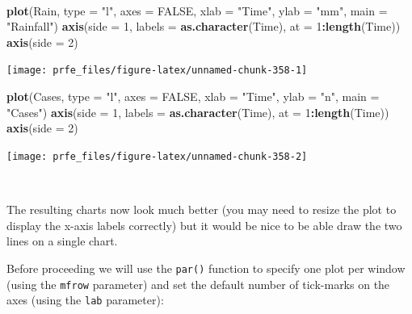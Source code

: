 \documentclass[12pt,a4paper]{book}
\newenvironment{Shaded}{\begin{snugshade}}{\end{snugshade}}
\newcommand{\DataTypeTok}[1]{\textcolor[rgb]{0.13,0.29,0.53}{#1}}
\newcommand{\DecValTok}[1]{\textcolor[rgb]{0.00,0.00,0.81}{#1}}
\newcommand{\KeywordTok}[1]{\textcolor[rgb]{0.13,0.29,0.53}{\textbf{#1}}}
\newcommand{\NormalTok}[1]{#1}
\newcommand{\OperatorTok}[1]{\textcolor[rgb]{0.81,0.36,0.00}{\textbf{#1}}}
\newcommand{\OtherTok}[1]{\textcolor[rgb]{0.56,0.35,0.01}{#1}}
\newcommand{\StringTok}[1]{\textcolor[rgb]{0.31,0.60,0.02}{#1}}
\theoremstyle{definition}
\theoremstyle{definition}
\theoremstyle{definition}
\theoremstyle{remark}
\begin{document}
~

\begin{Shaded}
\begin{Highlighting}[]
\KeywordTok{plot}\NormalTok{(Rain, }\DataTypeTok{type =} \StringTok{"l"}\NormalTok{, }\DataTypeTok{axes =} \OtherTok{FALSE}\NormalTok{, }\DataTypeTok{xlab =} \StringTok{"Time"}\NormalTok{, }\DataTypeTok{ylab =} \StringTok{"mm"}\NormalTok{, }\DataTypeTok{main =} \StringTok{"Rainfall"}\NormalTok{)}
\KeywordTok{axis}\NormalTok{(}\DataTypeTok{side =} \DecValTok{1}\NormalTok{, }\DataTypeTok{labels =} \KeywordTok{as.character}\NormalTok{(Time), }\DataTypeTok{at =} \DecValTok{1}\OperatorTok{:}\KeywordTok{length}\NormalTok{(Time))}
\KeywordTok{axis}\NormalTok{(}\DataTypeTok{side =} \DecValTok{2}\NormalTok{)}
\end{Highlighting}
\end{Shaded}

\begin{center}\texttt{[image: prfe\_files/figure-latex/unnamed-chunk-358-1]} \end{center}

\begin{Shaded}
\begin{Highlighting}[]
\KeywordTok{plot}\NormalTok{(Cases, }\DataTypeTok{type =} \StringTok{"l"}\NormalTok{, }\DataTypeTok{axes =} \OtherTok{FALSE}\NormalTok{, }\DataTypeTok{xlab =} \StringTok{"Time"}\NormalTok{, }\DataTypeTok{ylab =} \StringTok{"n"}\NormalTok{, }\DataTypeTok{main =} \StringTok{"Cases"}\NormalTok{)}
\KeywordTok{axis}\NormalTok{(}\DataTypeTok{side =} \DecValTok{1}\NormalTok{, }\DataTypeTok{labels =} \KeywordTok{as.character}\NormalTok{(Time), }\DataTypeTok{at =} \DecValTok{1}\OperatorTok{:}\KeywordTok{length}\NormalTok{(Time))}
\KeywordTok{axis}\NormalTok{(}\DataTypeTok{side =} \DecValTok{2}\NormalTok{)}
\end{Highlighting}
\end{Shaded}

\begin{center}\texttt{[image: prfe\_files/figure-latex/unnamed-chunk-358-2]} \end{center}

~

The resulting charts now look much better (you may need to resize the
plot to display the x-axis labels correctly) but it would be nice to be
able draw the two lines on a single chart.

Before proceeding we will use the \texttt{par()} function to specify one
plot per window (using the \texttt{mfrow} parameter) and set the default
number of tick-marks on the axes (using the \texttt{lab} parameter):
\end{document}
